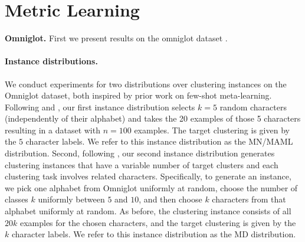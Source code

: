 \section{Metric Learning}

\medskip\noindent\textbf{Omniglot.} First we present results on the omniglot
dataset \cite{Lake1332}.

\paragraph{Instance distributions.} We conduct experiments for two distributions
over clustering instances on the Omniglot dataset, both inspired by prior work
on few-shot meta-learning. Following \cite{NIPS2016_6385} and
\cite{pmlr-v70-finn17a}, our first instance distribution selects $k = 5$ random
characters (independently of their alphabet) and takes the 20 examples of those
5 characters resulting in a dataset with $n = 100$ examples. The target
clustering is given by the $5$ character labels. We refer to this instance
distribution as the MN/MAML distribution. Second, following
\cite{DBLP:journals/corr/abs-1903-03096}, our second instance distribution generates
clustering instances that have a variable number of target clusters and each
clustering task involves related characters. Specifically, to generate an
instance, we pick one alphabet from Omniglot uniformly at random, choose the
number of classes $k$ uniformly between $5$ and $10$, and then choose $k$
characters from that alphabet uniformly at random. As before, the clustering
instance consists of all $20k$ examples for the chosen characters, and the
target clustering is given by the $k$ character labels. We refer to this
instance distribution as the MD distribution.

